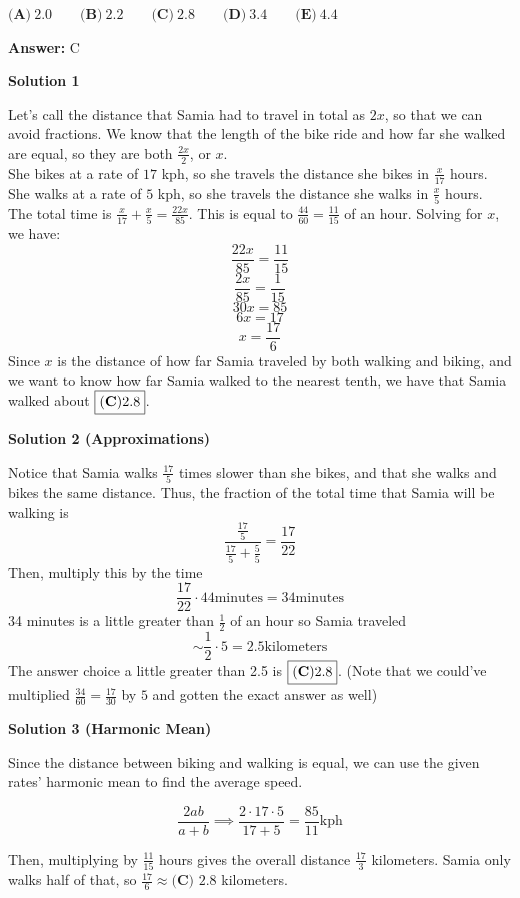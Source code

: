 \begin{enumerate}
 $\textbf{(A)}\ 2.0\qquad\textbf{(B)}\ 2.2\qquad\textbf{(C)}\ 2.8\qquad\textbf{(D)}\ 3.4\qquad\textbf{(E)}\ 4.4$

 \textbf{Answer: }C



\textbf{Solution 1}

Let's call the distance that Samia had to travel in total as $2x$, so that we can avoid fractions. We know that the length of the bike ride and how far she walked are equal, so they are both $\frac{2x}{2}$, or $x$.
 \[\]She bikes at a rate of $17$ kph, so she travels the distance she bikes in $\frac{x}{17}$ hours. She walks at a rate of $5$ kph, so she travels the distance she walks in $\frac{x}{5}$ hours.
 \[\]The total time is $\frac{x}{17}+\frac{x}{5} = \frac{22x}{85}$. This is equal to $\frac{44}{60} = \frac{11}{15}$ of an hour. Solving for $x$, we have:
 \[\]
 \[\frac{22x}{85} = \frac{11}{15}\]
 \[\frac{2x}{85} = \frac{1}{15}\]
 \[30x = 85\]
 \[6x = 17\]
 \[x = \frac{17}{6}\]
 \[\]Since $x$ is the distance of how far Samia traveled by both walking and biking, and we want to know how far Samia walked to the nearest tenth, we have that Samia walked about $\boxed{\bold{(C)} 2.8}$.

 



\textbf{Solution 2 (Approximations)}

Notice that Samia walks $\frac {17}{5}$ times slower than she bikes, and that she walks and bikes the same distance. Thus, the fraction of the total time that Samia will be walking is
 \[\frac{\frac{17}{5}}{\frac{17}{5}+\frac{5}{5}} = \frac{17}{22}\] Then, multiply this by the time
 \[\frac{17}{22} \cdot 44 \text{minutes} = 34 \text{minutes}\]34 minutes is a little greater than $\frac {1}{2}$ of an hour so Samia traveled 
 \[\sim \frac {1}{2} \cdot 5 = 2.5 \text{kilometers}\] The answer choice a little greater than 2.5 is $\boxed{\bold{(C)} 2.8}$. (Note that we could've multiplied $\frac {34}{60}=\frac {17}{30}$ by $5$ and gotten the exact answer as well)

 



\textbf{Solution 3 (Harmonic Mean)}

Since the distance between biking and walking is equal, we can use the given rates' harmonic mean to find the average speed.

 
 \[\frac{2ab}{a+b}\implies\frac{2 \cdot 17 \cdot 5}{17+5}=\frac{85}{11}\text{kph}\]

 Then, multiplying by $\frac{11}{15}$ hours gives the overall distance $\frac{17}{3}$ kilometers. Samia only walks half of that, so  $\frac{17}{6}\approx \boxed{\textbf{(C) }2.8}$ kilometers.


\end{enumerate}
